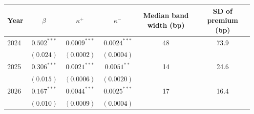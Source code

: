 \begin{tabular}{lccccc}
\toprule
 Year & $\beta$ & $\kappa^+$ & $\kappa^-$ & Median band width (bp) & SD of premium (bp) \\
\midrule
2024 & $0.502^{***}$ & $0.0009^{***}$ & $0.0024^{***}$ & 48 & 73.9 \\
 & $(0.024)$ & $(0.0002)$ & $(0.0004)$ & & \\
2025 & $0.306^{***}$ & $0.0021^{***}$ & $0.0051^{**}$ & 14 & 24.6 \\
 & $(0.015)$ & $(0.0006)$ & $(0.0020)$ & & \\
2026 & $0.167^{***}$ & $0.0044^{***}$ & $0.0025^{***}$ & 17 & 16.4 \\
 & $(0.010)$ & $(0.0009)$ & $(0.0004)$ & & \\
\bottomrule
\end{tabular}
